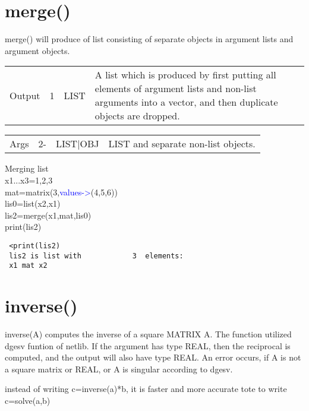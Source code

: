 \section{merge()}
\label{merge}
 \textcolor{VioletRed}{merge}() will produce of list consisting of separate objects
 in argument lists and argument objects.
\begin{table}[H]
\begin{tabular}{ m{}  m{}m{}p{}}
Output&1&LIST&A list which is produced by first putting all elements of
argument lists and non-list arguments into a vector, and then duplicate objects are dropped.
\\ \cline{1-4}
\end{tabular}
\end{table}
\vspace{-1.51em}
\begin{table}[H]
\begin{tabular}{ m{}  m{}m{}p{}}
Args&2-&LIST|OBJ& LIST and separate non-list objects.
\\ \cline{1-4}
\end{tabular}
\end{table}
\begin{example}[mergex]Merging list\\
\label{mergex}
 x1...x3=1,2,3\\
 mat=\textcolor{VioletRed}{matrix}(3,\textcolor{blue}{values->}(4,5,6))\\
 lis0=\textcolor{VioletRed}{list}(x2,x1)\\
 lis2=\textcolor{VioletRed}{merge}(x1,mat,lis0)\\
 \textcolor{VioletRed}{print}(lis2)
\color{Green}
\begin{verbatim}
 <print(lis2)
 lis2 is list with            3  elements:
 x1 mat x2
\end{verbatim}
\color{Black}
\end{example}
\section{inverse()}
\label{inverse}
 \textcolor{VioletRed}{inverse}(A) computes the inverse of a square MATRIX A. The function utilized dgesv funtion
 of netlib. If the argument has type REAL, then the reciprocal is computed,
 and the output will also have type REAL. An error occurs, if A is not
 a square matrix or REAL, or A is singular according to dgesv.
\begin{note}
instead of writing c=\textcolor{VioletRed}{inverse}(a)*b, it is faster and more accurate tote to
write c=\textcolor{VioletRed}{solve}(a,b)
\end{note}
